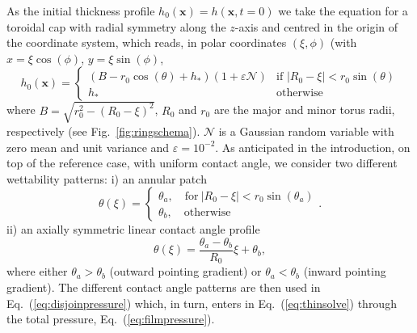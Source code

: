 \documentclass[twoside,twocolumn,9pt]{article}
\begin{document}
As the initial thickness profile $h_0(\mathbf{x})=h(\mathbf{x}, t=0)$ we take the equation for a toroidal cap with radial symmetry along the $z$-axis and centred in the origin of the coordinate system, which reads,
in polar coordinates $(\xi, \phi)$ (with $x = \xi \cos(\phi)$, $y=\xi \sin(\phi)$,
\begin{equation}\label{eq:torus}
h_0(\mathbf{x}) = 
\left\{
\begin{array}{ll}
\left(B - r_0\cos(\theta) + h_{\ast}\right)(1+\varepsilon\mathcal{N})  & \mbox{if } |R_0-\xi|<r_0 \sin(\theta)\\
h_{\ast} & \mbox{otherwise}
\end{array}
\right.
\end{equation}
where $B = \sqrt{r_0^2 - \left(R_0-\xi\right)^2}$, $R_0$ and $r_0$ are the major and minor torus radii, respectively (see Fig.~\ref{fig:ringschema}).
$\mathcal{N}$ is a Gaussian random variable with zero mean and 
unit variance and  $\varepsilon = 10^{-2}$.
As anticipated in the introduction, on top of the reference case, with uniform contact angle, we consider two different wettability patterns: i) an annular patch 
\begin{equation}\label{eq:theta_band}
    \theta(\xi) =\begin{cases}
        \theta_a,\quad \text{for}~|R_0-\xi|< r_0\sin(\theta_a) \\
        \theta_b,\quad \text{otherwise}
    \end{cases}.
\end{equation}
ii) an axially symmetric linear contact angle profile
\begin{equation}\label{eq:theta_grad}
    \theta(\xi) = \frac{\theta_{a}-\theta_{b}}{R_0} \xi + \theta_{b},
\end{equation}
where either $\theta_{a} > \theta_{b}$ (outward pointing gradient) or $\theta_a < \theta_b$ (inward pointing
 gradient).
The different contact angle patterns are then used in Eq.~(\ref{eq:disjoinpressure}) which, in turn, enters in Eq.~(\ref{eq:thinsolve}) through the total pressure, Eq.~(\ref{eq:filmpressure}).
\end{document}
